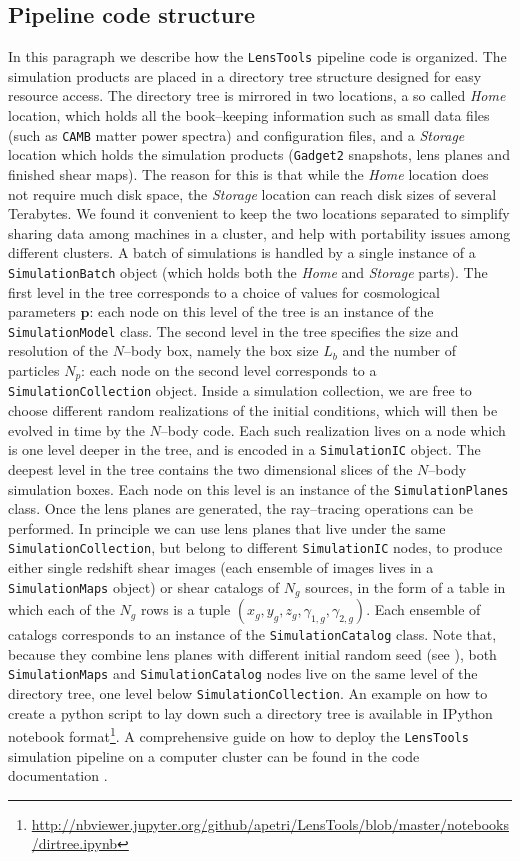 \documentclass[5p]{elsarticle}
\newcommand{\bb}[1]{\mathbf{#1}}
\newcommand{\ttt}[1]{\texttt{#1}}
\newcommand{\LT}{\texttt{LensTools} }
\begin{document}
\subsection{Pipeline code structure}
%
In this paragraph we describe how the \LT pipeline code is organized. The simulation products are placed in a directory tree structure designed for easy resource access. The directory tree is mirrored in two locations, a so called \textit{Home} location, which holds all the book--keeping information such as small data files (such as \ttt{CAMB} matter power spectra) and configuration files, and a \textit{Storage} location which holds the simulation products (\ttt{Gadget2} snapshots, lens planes and finished shear maps). The reason for this is that while the \textit{Home} location does not require much disk space, the \textit{Storage} location can reach disk sizes of several Terabytes. We found it convenient to keep the two locations separated to simplify sharing data among machines in a cluster, and help with portability issues among different clusters. 
A batch of simulations is handled by a single instance of a \ttt{SimulationBatch} object (which holds both the \textit{Home} and \textit{Storage} parts). The first level in the tree corresponds to a choice of values for cosmological parameters $\bb{p}$: each node on this level of the tree is an instance of the \ttt{SimulationModel} class. The second level in the tree specifies the size and resolution of the $N$--body box, namely the box size $L_b$ and the number of particles $N_p$: each node on the second level corresponds to a \ttt{SimulationCollection} object. Inside a simulation collection, we are free to choose different random realizations of the initial conditions, which will then be evolved in time by the $N$--body code. Each such realization lives on a node which is one level deeper in the tree, and is encoded in a \ttt{SimulationIC} object. The deepest level in the tree contains the two dimensional slices of the $N$--body simulation boxes. Each node on this level is an instance of the \ttt{SimulationPlanes} class. Once the lens planes are generated, the ray--tracing operations can be performed. In principle we can use lens planes that live under the same \ttt{SimulationCollection}, but belong to different \ttt{SimulationIC} nodes, to produce either single redshift shear images (each ensemble of images lives in a \ttt{SimulationMaps} object) or shear catalogs of $N_g$ sources, in the form of a table in which each of the $N_g$ rows is a tuple $(x_g,y_g,z_g,\gamma_{1,g},\gamma_{2,g})$. Each ensemble of catalogs corresponds to an instance of the \ttt{SimulationCatalog} class. Note that, because they combine lens planes with different initial random seed (see \citep{Petri16}), both \ttt{SimulationMaps} and \ttt{SimulationCatalog} nodes live on the same level of the directory tree, one level below \ttt{SimulationCollection}. An example on how to create a {\sc python} script to lay down such a directory tree is available in {\sc IPython} notebook format\footnote{\url{http://nbviewer.jupyter.org/github/apetri/LensTools/blob/master/notebooks/dirtree.ipynb}}. A comprehensive guide on how to deploy the \LT simulation pipeline on a computer cluster can be found in the code documentation \citep{lenstoolsdocs}.
\end{document}
